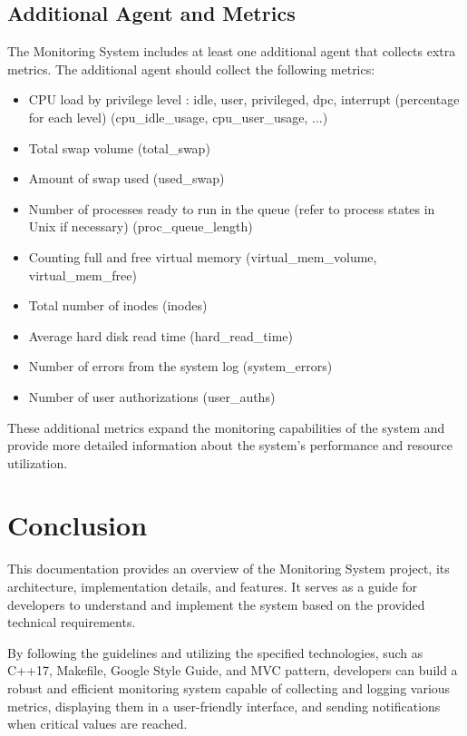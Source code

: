 \documentclass[12pt, letterpaper]{article}
\begin{document}
\subsection{Additional Agent and Metrics}
The Monitoring System includes at least one additional agent that collects extra metrics. The additional agent should collect the following metrics:
\begin{itemize}
    \item {\ttfamily [double]} CPU load by privilege level : idle, user, privileged, dpc, interrupt (percentage for each level) ({\ttfamily cpu\_idle\_usage, cpu\_user\_usage, ...})
    \item {\ttfamily [double]} Total swap volume ({\ttfamily total\_swap})
    \item {\ttfamily [double]} Amount of swap used ({\ttfamily used\_swap})
    \item {\ttfamily [int]} Number of processes ready to run in the queue (refer to process states in Unix if necessary) ({\ttfamily proc\_queue\_length})
    \item {\ttfamily [double]} Counting full and free virtual memory ({\ttfamily virtual\_mem\_volume, virtual\_mem\_free})
    \item {\ttfamily [int]} Total number of inodes ({\ttfamily inodes})
    \item {\ttfamily [double]} Average hard disk read time ({\ttfamily hard\_read\_time})
    \item {\ttfamily [int]} Number of errors from the system log ({\ttfamily system\_errors})
    \item {\ttfamily [int]} Number of user authorizations ({\ttfamily user\_auths})
\end{itemize}

These additional metrics expand the monitoring capabilities of the system and provide more detailed information about the system's performance and resource utilization.

\section*{Conclusion}

This documentation provides an overview of the Monitoring System project, its architecture, implementation details, and features. It serves as a guide for developers to understand and implement the system based on the provided technical requirements.

By following the guidelines and utilizing the specified technologies, such as C++17, Makefile, Google Style Guide, and MVC pattern, developers can build a robust and efficient monitoring system capable of collecting and logging various metrics, displaying them in a user-friendly interface, and sending notifications when critical values are reached.
\end{document}
